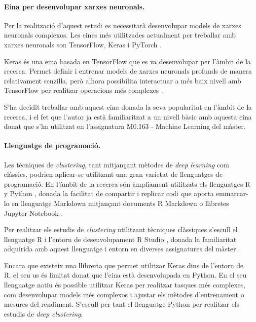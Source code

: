 \documentclass[CAT,BIB]{TFUOC}%
\begin{document}
        \paragraph{Eina per desenvolupar xarxes neuronals.}

            Per la realització d'aquest estudi es necessitarà desenvolupar models de xarxes neuronals complexos. Les eines més utilitzades actualment per treballar amb xarxes neuronals son TensorFlow, Keras i PyTorch \citep{Kaggle2021}.

            Keras \citep{Chollet2015} és una eina basada en TensorFlow \citep{Ghemawat2016} que es va desenvolupar per l'àmbit de la recerca. Permet definir i entrenar models de xarxes neuronals profunds de manera relativament senzilla, però alhora possibilita interactuar a més baix nivell amb TensorFlow per realitzar operacions més complexes \citep{Ketkar2021}.

            S'ha decidit treballar amb aquest eina donada la seva popularitat en l'àmbit de la recerca, i el fet que l'autor ja està familiaritzat a un nivell bàsic amb aquesta eina donat que s'ha utilitzat en l'assignatura M0.163 - Machine Learning del màster.

        \paragraph{Llenguatge de programació.}

            Les tècniques de \textit{clustering}, tant mitjançant mètodes de \textit{deep learning} com clàssics, podrien aplicar-se utilitzant una gran varietat de llenguatges de programació. En l'àmbit de la recerca són àmpliament utilitzats els llenguatges \textsf{R} \citep{RCoreTeam2017} y Python \citep{VanRossum2009} \citep{Kaggle2021}, donada la facilitat de compartir i replicar codi que aporta emmarcar-lo en llenguatge Markdown mitjançant documents R Markdown \citep{Xie2016} o llibretes Jupyter Notebook \citep{Kluyver2016}.

            Per realitzar els estudis de \textit{clustering} utilitzant tècniques clàssiques s'escull el llenguatge \textsf{R} i l'entorn de desenvolupament \textsf{R} Studio \citep{RStudioTeam2020}, donada la familiaritat adquirida amb aquest llenguatge i entorn en diverses assignatures del màster.

            Encara que existeix una llibreria que permet utilitzar Keras dins de l'entorn de \textsf{R}, el seu us és limitat donat que l'eina està desenvolupada en Python. En el seu llenguatge natiu és possible utilitzar Keras per realitzar tasques més complexes, com desenvolupar models més complexos i ajustar els mètodes d'entrenament o mesures del rendiment. S'escull per tant el llenguatge Python per realitzar els estudis de \textit{deep clustering}.
\end{document}
